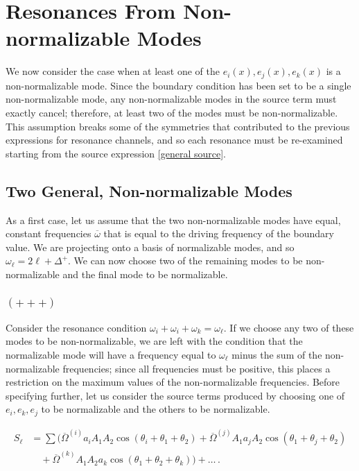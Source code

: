 \documentclass[letterpaper,11pt]{article}
\newcommand{\oi}{\omega_i}
\newcommand{\ok}{\omega_k}
\newcommand{\ol}{\omega_\ell}
\newcommand{\thi}{\theta_i}
\newcommand{\thk}{\theta_k}
\newcommand{\ob}{\overline{\omega}}
\begin{document}

\section{Resonances From Non-normalizable Modes}

We now consider the case when at least one of the $e_i(x), e_j(x), e_k(x)$ is a non-normalizable mode. Since the boundary condition has been set to be a single non-normalizable mode, any non-normalizable modes in the source term must exactly cancel; therefore, at least two of the modes must be non-normalizable. This assumption breaks some of the symmetries that contributed to the previous expressions for resonance channels, and so each resonance must be re-examined starting from the source expression \eqref{general source}.

\subsection{Two General, Non-normalizable Modes}

As a first case, let us assume that the two non-normalizable modes have equal, constant frequencies $\ob$ that is equal to the driving frequency of the boundary value. We are projecting onto a basis of normalizable modes, and so $\ol = 2\ell + \Delta^+$. We can now choose two of the remaining modes to be non-normalizable and the final mode to be normalizable.

\subsubsection{$(+++)$}

Consider the resonance condition $\oi + \oi + \ok = \ol$. If we choose any two of these modes to be non-normalizable, we are left with the condition that the normalizable mode will have a frequency equal to $\ol$ minus the sum of the non-normalizable frequencies; since all frequencies must be positive, this places a restriction on the maximum values of the non-normalizable frequencies. Before specifying further, let us consider the source terms produced by choosing one of $e_i, e_k, e_j$ to be normalizable and the others to be normalizable. 

\begin{align}
S_\ell &= \sum \Big( \overline{\Omega}^{(i)} a_i A_1 A_2 \cos \left(\thi + \theta_1 + \theta_2 \right) + \overline{\Omega}^{(j)} A_1 a_j A_2 \cos \left(\theta_1 + \theta_j + \theta_2 \right) \nonumber \\
& \quad + \overline{\Omega}^{(k)} A_1 A_2 a_k \cos \left(\theta_1 + \theta_2 + \thk \right) \Big) + \ldots \, .
\end{align}
\end{document}
